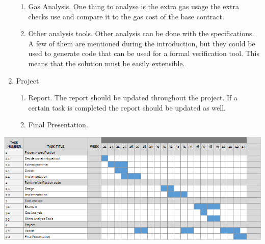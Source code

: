 \documentclass[a4paper]{article}
\begin{document}
\begin{enumerate}
\begin{enumerate}[label*=\arabic*.]
        \item Gas Analysis. One thing to analyse is the extra gas usage the extra checks use and compare it to the gas cost of the base contract.
        \item Other analysis tools. Other analysis can be done with the specifications. A few of them are mentioned during the introduction, but they could be used to generate code that can be used for a formal verification tool. This means that the solution must be easily extensible.
    \end{enumerate}
    \item Project 
    \begin{enumerate}[label*=\arabic*.] 
        \item Report. The report should be updated throughout the project. If a certain task is completed the report should be updated as well. 
        \item Final Presentation. 
    \end{enumerate}
\end{enumerate}
    
\begin{center}
    \includegraphics[angle =90]{resources/Planning.png}
\end{center}




\end{document}
